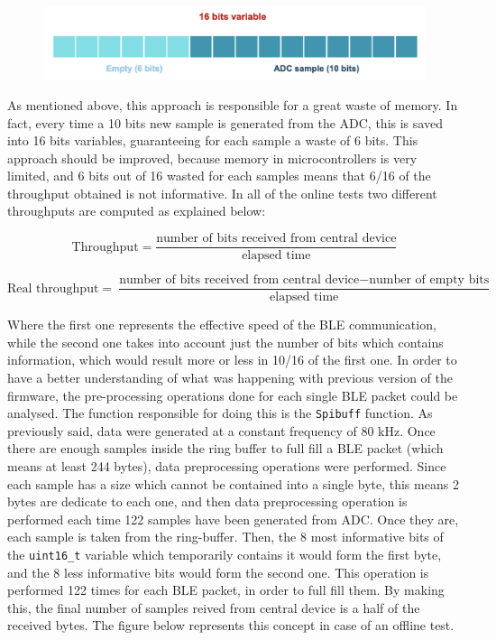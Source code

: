\documentclass{Configuration_Files/PoliMi3i_thesis}
\begin{document}
\begin{figure}[H]
    \centering
    \includegraphics[scale=0.7]{Shift Algorithm/Screenshot 2024-07-22 at 22.31.12.png}
    \label{fig:pairing_procedure}
\end{figure}


As mentioned above, this approach is responsible for a great waste of memory. In fact, every time a 10 bits new sample is generated from the ADC, this is saved into 16 bits variables, guaranteeing for each sample a waste of 6 bits. This approach should be improved, because memory in microcontrollers is very limited, and 6 bits out of 16 wasted for each samples means that 6/16 of the throughput obtained is not informative. In all of the online tests two different throughputs are computed as explained below:

\[
\text{Throughput} = \frac{\text{number of bits received from central device}}{\text{elapsed time}}
\]

\[
\text{Real throughput} = \frac{\text{number of bits received from central device} - \text{number of empty bits}}{\text{elapsed time}}
\]

Where the first one represents the effective speed of the BLE communication, while the second one takes into account just the number of bits which contains information, which would result more or less in 10/16 of the first one. In order to have a better understanding of what was happening with previous version of the firmware, the pre-processing operations done for each single BLE packet could be analysed. The function responsible for doing this is the \texttt{Spibuff} function. As previously said, data were generated at a constant frequency of 80 kHz. Once there are enough samples inside the ring buffer to full fill a BLE packet (which means at least 244 bytes), data preprocessing operations were performed. Since each sample has a size which cannot be contained into a single byte, this means 2 bytes are dedicate to each one, and then data preprocessing operation is performed each time 122 samples have been generated from ADC. Once they are, each sample is taken from the ring-buffer. Then, the 8 most informative bits of the \texttt{uint16\_t} variable which temporarily contains it would form the first byte, and the 8 less informative bits would form the second one. This operation is performed 122 times for each BLE packet, in order to full fill them. By making this, the final number of samples reived from central device is a half of the received bytes. The figure below represents this concept in case of an offline test.
\end{document}
